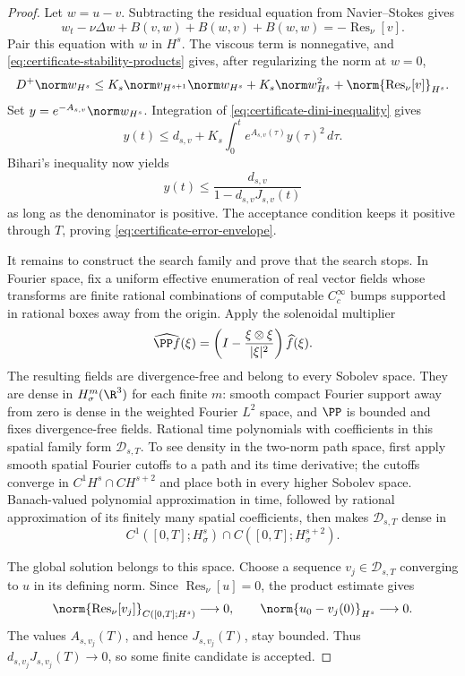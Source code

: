 \begin{proof}
Let \(w=u-v\).  Subtracting the residual equation from Navier--Stokes gives
\[
 w_t-\nu\Delta w+B(v,w)+B(w,v)+B(w,w)
 =-\operatorname{Res}_\nu[v].
\]
Pair this equation with \(w\) in \(H^s\).  The viscous term is nonnegative,
and \eqref{eq:certificate-stability-products} gives, after regularizing the
norm at \(w=0\),
\begin{equation}
 D^+\norm w_{H^s}
 \le
 K_s\norm v_{H^{s+1}}\norm w_{H^s}
 +K_s\norm w_{H^s}^2
 +\norm{\operatorname{Res}_\nu[v]}_{H^s}.
 \label{eq:certificate-dini-inequality}
\end{equation}
Set \(y=e^{-A_{s,v}}\norm w_{H^s}\).  Integration of
\eqref{eq:certificate-dini-inequality} gives
\[
 y(t)
 \le d_{s,v}
 +K_s\int_0^t e^{A_{s,v}(\tau)}y(\tau)^2\,d\tau.
\]
Bihari's inequality now yields
\[
 y(t)
 \le
 \frac{d_{s,v}}{1-d_{s,v}J_{s,v}(t)}
\]
as long as the denominator is positive.  The acceptance condition keeps it
positive through \(T\), proving
\eqref{eq:certificate-error-envelope}.

It remains to construct the search family and prove that the search stops.
In Fourier space, fix a uniform effective enumeration of real vector fields
whose transforms are finite rational combinations of computable
\(C_c^\infty\) bumps supported in rational boxes away from the origin.
Apply the solenoidal multiplier
\[
 \widehat{\PP f}(\xi)
 =\left(I-\frac{\xi\otimes\xi}{|\xi|^2}\right)\widehat f(\xi).
\]
The resulting fields are divergence-free and belong to every Sobolev space.
They are dense in \(H_\sigma^m(\R^3)\) for each finite \(m\): smooth compact
Fourier support away from zero is dense in the weighted Fourier \(L^2\)
space, and \(\PP\) is bounded and fixes divergence-free fields.  Rational
time polynomials with coefficients in this spatial family form
\(\mathscr D_{s,T}\).  To see density in the two-norm path space, first apply
smooth spatial Fourier cutoffs to a path and its time derivative; the cutoffs
converge in \(C^1H^s\cap CH^{s+2}\) and place both in every higher Sobolev
space.  Banach-valued polynomial approximation in time, followed by rational
approximation of its finitely many spatial coefficients, then makes
\(\mathscr D_{s,T}\) dense in
\[
 C^1([0,T];H_\sigma^s)
 \cap C([0,T];H_\sigma^{s+2}).
\]

The global solution belongs to this space.  Choose a sequence
\(v_j\in\mathscr D_{s,T}\) converging to \(u\) in its defining norm.  Since
\(\operatorname{Res}_\nu[u]=0\), the product estimate gives
\[
 \norm{\operatorname{Res}_\nu[v_j]}_{C([0,T];H^s)}
 \longrightarrow0,
 \qquad
 \norm{u_0-v_j(0)}_{H^s}\longrightarrow0.
\]
The values \(A_{s,v_j}(T)\), and hence \(J_{s,v_j}(T)\), stay bounded.  Thus
\(d_{s,v_j}J_{s,v_j}(T)\to0\), so some finite candidate is accepted.


\end{proof}
